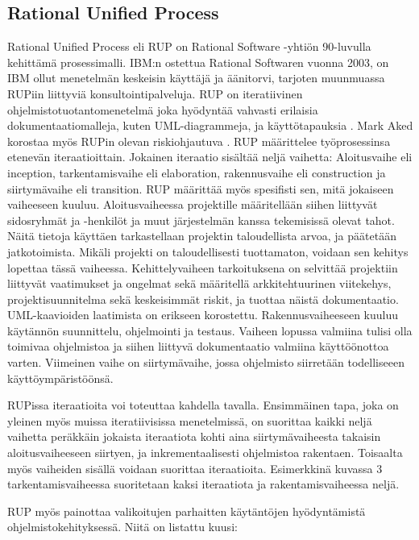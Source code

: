 \documentclass[finnish,12pt]{tktltiki2}
\theoremstyle{definition}
\theoremstyle{remark}
\begin{document}
 
\subsection{Rational Unified Process}

Rational Unified Process eli RUP on Rational Software -yhtiön 90-luvulla kehittämä prosessimalli. IBM:n ostettua Rational Softwaren vuonna 2003, on IBM ollut menetelmän keskeisin käyttäjä ja äänitorvi, tarjoten muunmuassa RUPiin liittyviä konsultointipalveluja. 
RUP on iteratiivinen ohjelmistotuotantomenetelmä joka hyödyntää vahvasti erilaisia dokumentaatiomalleja, kuten UML-diagrammeja, ja käyttötapauksia \cite{Ruparelia:2010:SDL:1764810.1764814}. Mark Aked korostaa myös RUPin olevan riskiohjautuva \cite{Aked03}.
RUP määrittelee työprosessinsa etenevän iteraatioittain. Jokainen iteraatio sisältää neljä vaihetta: Aloitusvaihe eli inception, tarkentamisvaihe eli elaboration, rakennusvaihe eli construction ja siirtymävaihe eli transition. RUP määrittää myös spesifisti sen, mitä jokaiseen vaiheeseen kuuluu. 
Aloitusvaiheessa projektille määritellään siihen liittyvät sidosryhmät ja -henkilöt ja muut järjestelmän kanssa tekemisissä olevat tahot. Näitä tietoja käyttäen tarkastellaan projektin taloudellista arvoa, ja päätetään jatkotoimista. Mikäli projekti on taloudellisesti tuottamaton, voidaan sen kehitys lopettaa tässä vaiheessa. 
Kehittelyvaiheen tarkoituksena on selvittää projektiin liittyvät vaatimukset ja ongelmat sekä määritellä arkkitehtuurinen viitekehys, projektisuunnitelma sekä keskeisimmät riskit, ja tuottaa näistä dokumentaatio. UML-kaavioiden laatimista on erikseen korostettu.
Rakennusvaiheeseen kuuluu käytännön suunnittelu, ohjelmointi ja testaus. Vaiheen lopussa valmiina tulisi olla toimivaa ohjelmistoa ja siihen liittyvä dokumentaatio valmiina käyttöönottoa varten.
Viimeinen vaihe on siirtymävaihe, jossa ohjelmisto siirretään todelliseeen käyttöympäristöönsä.



RUPissa iteraatioita voi toteuttaa kahdella tavalla. Ensimmäinen tapa, joka on yleinen myös muissa iteratiivisissa menetelmissä, on suorittaa kaikki neljä vaihetta peräkkäin jokaista iteraatiota kohti aina siirtymävaiheesta takaisin aloitusvaiheeseen siirtyen, ja inkrementaalisesti ohjelmistoa rakentaen. Toisaalta myös vaiheiden sisällä voidaan suorittaa iteraatioita. Esimerkkinä kuvassa 3 tarkentamisvaiheessa suoritetaan kaksi iteraatiota ja rakentamisvaiheessa neljä.

RUP myös painottaa valikoitujen parhaitten käytäntöjen hyödyntämistä ohjelmistokehityksessä. Niitä on listattu kuusi\cite{rational01}: 
\end{document}
